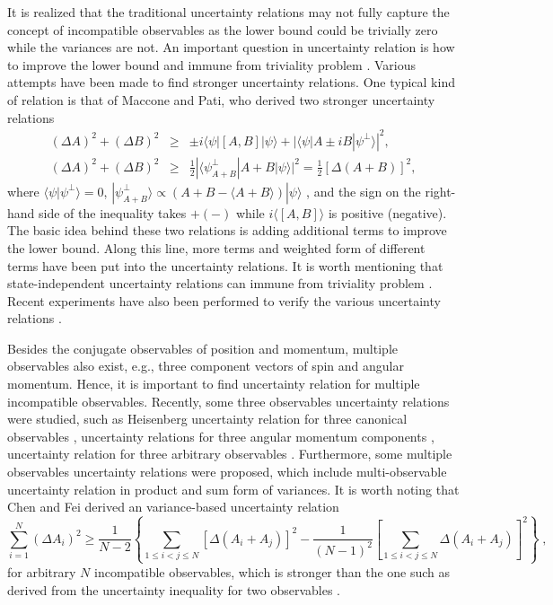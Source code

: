 \documentclass[fleqn,10pt]{wlscirep}
\begin{document}
It is realized that the traditional uncertainty relations may not fully capture the concept of incompatible observables as the lower bound could be trivially zero while the variances are not. An important question in uncertainty relation is how to improve the lower bound and immune from triviality problem \cite{mp,Coles}. Various attempts have been made to find stronger uncertainty relations. One typical kind of relation is that of Maccone and Pati, who derived two stronger uncertainty relations
%
\begin{eqnarray}
(\Delta A)^2 + (\Delta B)^2 & \geq &
\pm i\langle\psi|[A,B]|\psi\rangle+|\langle\psi|A \pm iB|\psi^\perp\rangle|^2, \label{Maccone} \\
(\Delta A)^2 + (\Delta B)^2 & \geq &
\frac 12|\langle\psi^\perp_{A+B}|A+B|\psi\rangle|^2=\frac 12[\Delta (A+B)]^2, \label{Maccone2p}
\end{eqnarray}
%
where $\langle \psi|\psi^\perp\rangle = 0$, $|\psi^\perp_{A+B}\rangle\propto(A+B-\langle A + B\rangle)|\psi\rangle$ , and the sign on the right-hand side of the inequality takes $+(-)$ while $ i\langle[A,B]\rangle$ is positive (negative). The basic idea behind these two relations is adding additional terms to improve the lower bound. Along this line, more terms \cite{bannur,sun,song}  and weighted form of different terms \cite{xiao,zhang} have been put into the uncertainty relations. It is worth mentioning that state-independent uncertainty relations can immune from triviality problem \cite{Huang,L1,L2,Branciard}. Recent experiments have also been performed to verify the various uncertainty relations \cite{xue,du,baek,feng}.

Besides the conjugate observables of position and momentum, multiple observables also exist, e.g., three component vectors of spin and angular momentum. Hence, it is important to find uncertainty relation for multiple incompatible observables. Recently, some three observables uncertainty relations were studied, such as Heisenberg uncertainty relation for three canonical observables \cite {Kechrimparis}, uncertainty relations for three angular momentum components \cite{dammeier}, uncertainty relation for three arbitrary observables \cite{song}.
Furthermore, some multiple observables uncertainty relations were proposed, which include multi-observable uncertainty relation in product \cite{qin,naihuan} and sum \cite{long,chenfei} form of variances. It is worth noting that Chen and Fei derived an variance-based uncertainty relation \cite{chenfei}
%
\begin{equation}\label{chen}
\sum_{i=1}^{N}(\Delta A_{i})^{2}\geq\frac{1}{N-2}\left\{\sum_{1\leq i<j\leq N}\left[\Delta (A_{i}+A_{j})\right]^2
-\frac{1}{(N-1)^2}\left[\sum_{1\leq i<j\leq N}\Delta (A_{i}+A_{j})\right]^2\right\}\; ,
\end{equation}
for arbitrary $N$ incompatible observables, which is stronger than the one such as derived from the uncertainty inequality for two observables \cite{mp}.
\end{document}
